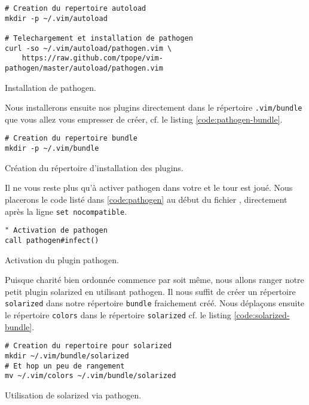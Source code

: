 \begin{listing}[H]
\begin{verbatim}
# Creation du repertoire autoload
mkdir -p ~/.vim/autoload 

# Telechargement et installation de pathogen
curl -so ~/.vim/autoload/pathogen.vim \
    https://raw.github.com/tpope/vim-pathogen/master/autoload/pathogen.vim
\end{verbatim}
  \caption{Installation de pathogen.}
  \label{code:pathogen-install}
\end{listing}

Nous installerons ensuite nos plugins directement dans le répertoire \Verb|.vim/bundle| que vous allez vous empresser de créer, cf. le listing \ref{code:pathogen-bundle}.

\begin{listing}[H]
\begin{verbatim}
# Creation du repertoire bundle
mkdir -p ~/.vim/bundle
\end{verbatim}
  \caption{Création du répertoire d'installation des plugins.}
  \label{code:pathogen-bundle}
\end{listing}

Il ne vous reste plus qu'à activer pathogen dans votre \vimrc et le tour est joué. Nous placerons le code listé dans 
\ref{code:pathogen} au début du fichier \vimrc, directement après la ligne \Verb|set nocompatible|.

\begin{listing}[H]

\begin{verbatim}
" Activation de pathogen
call pathogen#infect()
\end{verbatim}
\caption{Activation du plugin pathogen.}
\label{code:pathogen}
\end{listing}

Puisque charité bien ordonnée commence par soit même, nous allons ranger notre petit plugin solarized en utilisant pathogen. Il nous suffit de créer un répertoire \Verb|solarized| dans notre répertoire \Verb|bundle| fraichement créé. Nous déplaçons ensuite le répertoire \Verb|colors| dans le répertoire \Verb|solarized| cf. le listing \ref{code:solarized-bundle}.

\begin{listing}[H]
\begin{verbatim}
# Creation du repertoire pour solarized
mkdir ~/.vim/bundle/solarized
# Et hop un peu de rangement
mv ~/.vim/colors ~/.vim/bundle/solarized
\end{verbatim}
  \caption{Utilisation de solarized via pathogen.}
  \label{code:solarized-bundle}
\end{listing}

